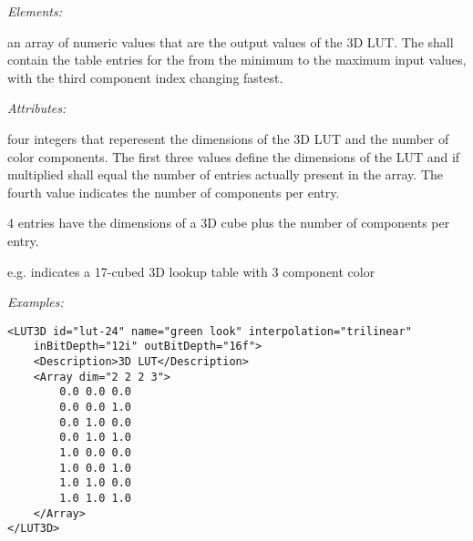 \emph{Elements:}
\begin{xmlfields}
    \xmlitem[Array][required] 
    an array of numeric values that are the output values of the 3D LUT.  The  shall contain the table entries for the  from the minimum to the maximum input values, with the third component index changing fastest.
    
    \emph{Attributes:}
    \begin{xmlfields}
        \xmlitem[dim][required] 
        four integers that reperesent the dimensions of the 3D LUT and the number of color components. The first three values define the dimensions of the LUT and if multiplied shall equal the number of entries actually present in the array. The fourth value indicates the number of components per entry.
        
        4 entries have the dimensions of a 3D cube plus the number of components per entry.
        \begin{list}{}{\setlength{\itemsep}{4pt}\setlength{\topsep}{0pt}}
                \item e.g.  indicates a 17-cubed 3D lookup table with 3 component color
        \end{list}
        
    \end{xmlfields}
    

\end{xmlfields}
        
\emph{Examples:}
\begin{lstlisting}[caption=Example of a simple \xml{LUT3D},label=ex:3dlut]
<LUT3D id="lut-24" name="green look" interpolation="trilinear" 
    inBitDepth="12i" outBitDepth="16f">
    <Description>3D LUT</Description>
    <Array dim="2 2 2 3">
        0.0 0.0 0.0
        0.0 0.0 1.0
        0.0 1.0 0.0
        0.0 1.0 1.0
        1.0 0.0 0.0
        1.0 0.0 1.0
        1.0 1.0 0.0
        1.0 1.0 1.0
    </Array>
</LUT3D>
\end{lstlisting}

